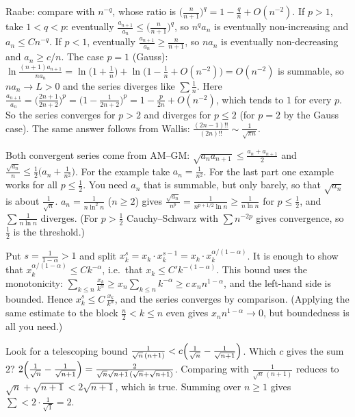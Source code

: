 \documentclass[11pt,a4paper]{article}
\begin{document}

 Raabe: compare with \(n^{-q}\), whose ratio is \(\bigl(\frac n{n+1}\bigr)^q=1-\frac qn+O(n^{-2})\). If \(p\gt1\), take \(1\lt q\lt p\): eventually \(\frac{a_{n+1}}{a_n}\le\bigl(\frac n{n+1}\bigr)^q\), so \(n^qa_n\) is eventually non-increasing and \(a_n\le Cn^{-q}\). If \(p\lt1\), eventually \(\frac{a_{n+1}}{a_n}\ge\frac n{n+1}\), so \(na_n\) is eventually non-decreasing and \(a_n\ge c/n\).
 The case \(p=1\) (Gauss): \(\ln\frac{(n+1)a_{n+1}}{na_n}=\ln\bigl(1+\frac1n\bigr)+\ln\bigl(1-\frac1n+O(n^{-2})\bigr)=O(n^{-2})\) is summable, so \(na_n\to L\gt0\) and the series diverges like \(\sum\frac1n\).
 Here \(\frac{a_{n+1}}{a_n}=\bigl(\frac{2n+1}{2n+2}\bigr)^p=\bigl(1-\frac1{2n+2}\bigr)^p=1-\frac p{2n}+O(n^{-2})\), which tends to \(1\) for every \(p\). So the series converges for \(p\gt2\) and diverges for \(p\le2\) (for \(p=2\) by the Gauss case). The same answer follows from Wallis: \(\frac{(2n-1)!!}{(2n)!!}\sim\frac1{\sqrt{\pi n}}\).

 Both convergent series come from AM--GM: \(\sqrt{a_na_{n+1}}\le\frac{a_n+a_{n+1}}2\) and \(\frac{\sqrt{a_n}}n\le\frac12\bigl(a_n+\frac1{n^2}\bigr)\). For the example take \(a_n=\frac1{n^2}\).
 For the last part one example works for all \(p\le\frac12\). You need \(a_n\) that is summable, but only barely, so that \(\sqrt{a_n}\) is about \(\frac1{\sqrt n}\).
 \(a_n=\frac1{n\ln^2n}\) (\(n\ge2\)) gives \(\frac{\sqrt{a_n}}{n^p}=\frac1{n^{p+1/2}\ln n}\ge\frac1{n\ln n}\) for \(p\le\frac12\), and \(\sum\frac1{n\ln n}\) diverges. (For \(p\gt\frac12\) Cauchy--Schwarz with \(\sum n^{-2p}\) gives convergence, so \(\frac12\) is the threshold.)

 Put \(s=\frac1{1-\alpha}\gt1\) and split \(x_k^s=x_k\cdot x_k^{s-1}=x_k\cdot x_k^{\alpha/(1-\alpha)}\). It is enough to show that \(x_k^{\alpha/(1-\alpha)}\le Ck^{-\alpha}\), i.e.\ that \(x_k\le C'k^{-(1-\alpha)}\).
 This bound uses the monotonicity: \(\sum_{k\le n}\frac{x_k}{k^\alpha}\ge x_n\sum_{k\le n}k^{-\alpha}\ge c\,x_nn^{1-\alpha}\), and the left-hand side is bounded.
 Hence \(x_k^s\le C\,\frac{x_k}{k^\alpha}\), and the series converges by comparison. (Applying the same estimate to the block \(\frac n2\lt k\le n\) even gives \(x_nn^{1-\alpha}\to0\), but boundedness is all you need.)

 Look for a telescoping bound \(\frac1{\sqrt n\,(n+1)}< c\Bigl(\frac1{\sqrt n}-\frac1{\sqrt{n+1}}\Bigr)\). Which \(c\) gives the sum \(2\)?
 \(2\Bigl(\frac1{\sqrt n}-\frac1{\sqrt{n+1}}\Bigr)=\frac{2}{\sqrt n\sqrt{n+1}\,(\sqrt n+\sqrt{n+1})}\).
 Comparing with \(\frac1{\sqrt n\,(n+1)}\) reduces to \(\sqrt n+\sqrt{n+1}\lt2\sqrt{n+1}\), which is true. Summing over \(n\ge1\) gives \(\sum\lt2\cdot\frac1{\sqrt1}=2\).
\end{document}
